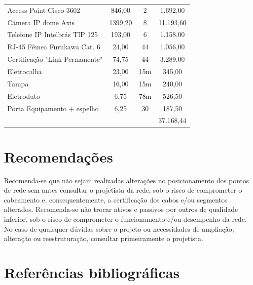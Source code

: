 \documentclass[	DIV=calc,%
							paper=a4,%
							fontsize=12pt,%
							onecolumn]{scrartcl}	 					%
\begin{document}
\begin{table}[h!]
\begin{tabular}{lccc}
		Access Point Cisco 3602           & 846,00                             & 2                                       & 1.692,00                                                        \\
		Câmera IP dome Axis               & 1399,20                            & 8                                       & 11.193,60                                                       \\
		Telefone IP Intelbrás TIP 125     & 193,00                             & 6                                       & 1.158,00                                                        \\
		RJ-45 Fêmea Furukawa Cat. 6       & 24,00                              & 44                                      & 1.056,00                                                        \\
		Certificação "Link Permanente"    & 74,75                              & 44                                      & 3.289,00                                                        \\
		Eletrocalha                       & 23,00                              & 15m                                     & 345,00                                                          \\
		Tampa                             & 16,00                              & 15m                                     & 240,00                                                          \\
		Eletroduto                        & 6,75                               & 78m                                     & 526,50                                                          \\
		Porta Equipamento + espelho       & 6,25                               & 30                                      & 187,50                                                          \\ \cline{4-4} 
		& \multicolumn{1}{l}{}               & \multicolumn{1}{l}{}                    & \multicolumn{1}{l}{37.168,44} 
	\end{tabular}
\end{table}

\section{Recomendações}
Recomenda-se que não sejam realizadas alterações no posicionamento dos pontos de rede sem antes consultar o projetista da rede, sob o risco de comprometer o cabeamento e, consequentemente, a certificação dos cabos e/ou segmentos alterados.
Recomenda-se não trocar ativos e passivos por outros de qualidade inferior, sob o risco de comprometer o funcionamento e/ou desempenho da rede.
No caso de quaisquer dúvidas sobre o projeto ou necessidades de ampliação, alteração ou reestruturação, consultar primeiramente o projetista.

\section{Referências bibliográficas}

\renewcommand\refname{} %

  
\end{document}
